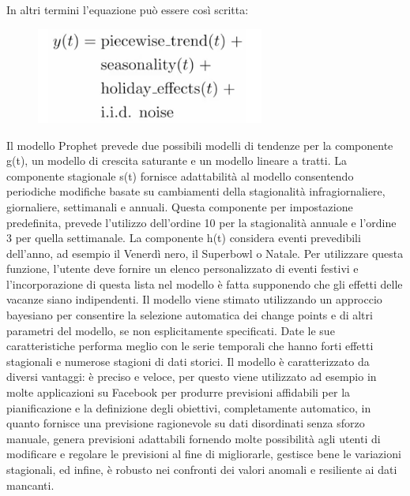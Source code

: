 \documentclass[12pt, a4paper, twocolumn]{article} %
\begin{document}
In altri termini l’equazione può essere così scritta:
\begin{figure}[H]
  \caption{}
  \begin{center}
    \includegraphics[width=75mm,scale=0.5]{prophet.png}
  \end{center}
\end{figure}

Il modello Prophet prevede due possibili modelli di tendenze per la componente g(t), un modello di crescita saturante e un modello lineare a tratti. La componente stagionale s(t) fornisce adattabilità al modello consentendo periodiche modifiche basate su cambiamenti della stagionalità infragiornaliere, giornaliere, settimanali e annuali. Questa componente per impostazione predefinita, prevede l'utilizzo dell’ordine 10 per la stagionalità annuale e l'ordine 3 per quella settimanale. La componente h(t) considera eventi prevedibili dell'anno, ad esempio  il Venerdì nero, il Superbowl o Natale. Per utilizzare questa funzione, l'utente deve fornire un elenco personalizzato di eventi festivi e l’incorporazione di questa lista nel modello è fatta supponendo che gli effetti delle vacanze siano indipendenti. Il modello viene stimato utilizzando un approccio bayesiano per consentire la selezione automatica dei change points e di altri parametri del modello, se non esplicitamente specificati. Date le sue caratteristiche performa meglio con le serie temporali che hanno forti effetti stagionali e numerose stagioni di dati storici. Il modello è caratterizzato da diversi vantaggi: è preciso e veloce, per questo viene utilizzato ad esempio in molte applicazioni su Facebook per produrre previsioni affidabili per la pianificazione e la definizione degli obiettivi, completamente automatico, in quanto fornisce una previsione ragionevole su dati disordinati senza sforzo manuale, genera previsioni adattabili fornendo molte possibilità agli utenti di modificare e regolare le previsioni al fine di migliorarle, gestisce bene le variazioni stagionali, ed infine, è robusto nei confronti dei valori anomali e resiliente ai dati mancanti.\\
\end{document}
